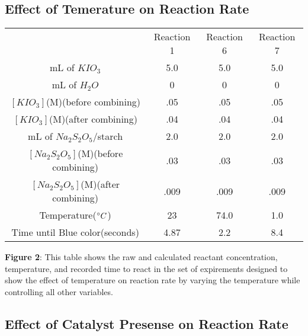 \documentclass{article}
\begin{document}
\subsection{Effect of Temerature on Reaction Rate}
\begin{table}[H]
    \begin{center}
    \begin{tabularx}{400pt}{c|c|c|c} & Reaction 1 & Reaction 6 & Reaction 7 \\
    mL of $KIO_3$ & 5.0 & 5.0 & 5.0 \\
    mL of $H_2O$ & 0 & 0 & 0 \\
    $[KIO_3]$(M)(before combining) & .05 & .05 & .05 \\
    $[KIO_3]$(M)(after combining) & .04 & .04 & .04 \\
    mL of $Na_2S_2O_5$/starch & 2.0 & 2.0 & 2.0 \\
    $[Na_2S_2O_5]$(M)(before combining) & .03 & .03 & .03 \\
    $[Na_2S_2O_5]$(M)(after combining) & .009 & .009 & .009 \\
    Temperature($\degree C$) & 23 & 74.0 & 1.0\\
    Time until Blue color(seconds) & 4.87 & 2.2 & 8.4 \\

    \end{tabularx}
    \end{center}
\end{table}
\textbf{Figure 2}: This table shows the raw and calculated reactant concentration, temperature, and recorded time to react in the set of expirements designed to show the effect of temperature on reaction rate by varying the temperature while controlling all other variables.
\subsection{Effect of Catalyst Presense on Reaction Rate}
\end{document}
